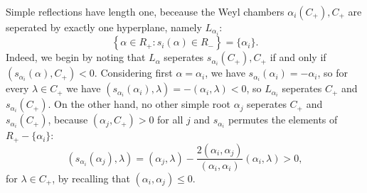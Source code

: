 \documentclass{report}
\begin{document}
\begin{example}
    Simple reflections have length one, beceause the Weyl chambers $\alpha_i(C_+), C_+$ are seperated by exactly one hyperplane, namely $L_{\alpha_i}$:
    \[
    \left\{ \alpha \in R_+ : s_i(\alpha) \in R_- \right\} = \{\alpha_i\}.
    \]
    Indeed, we begin by noting that $L_{\alpha}$ seperates $s_{\alpha_i}(C_+), C_+$ if and only if $(s_{\alpha_i}(\alpha), C_+) < 0$.
    Considering first $\alpha = \alpha_i$, we have $s_{\alpha_i}(\alpha_i) = -\alpha_i$, so for every $\lambda \in C_+$ we have $\left(s_{\alpha_i}(\alpha_i), \lambda\right) = -(\alpha_i, \lambda) < 0$, so $L_{\alpha_i}$ seperates $C_+$ and $s_{\alpha_i}(C_+)$.
    On the other hand, no other simple root $\alpha_j$ seperates $C_+$ and $s_{\alpha_i}(C_+)$, because $(\alpha_j, C_+) > 0$ for all $j$ and $s_{\alpha_i}$ permutes the elements of $R_+ - \{\alpha_i\}$:
    \[
    \left( s_{\alpha_i}(\alpha_j), \lambda \right) = (\alpha_j, \lambda) - \frac{2(\alpha_i, \alpha_j)}{(\alpha_i, \alpha_i)}(\alpha_i, \lambda) > 0,
    \]
    for $\lambda \in C_+$, by recalling that $(\alpha_i, \alpha_j) \leq 0$.
\end{example}
\end{document}
